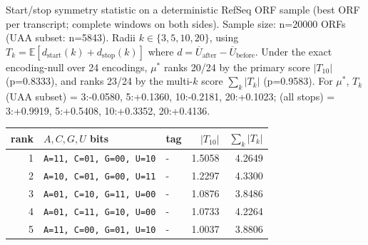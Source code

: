 Start/stop symmetry statistic on a deterministic RefSeq ORF sample (best ORF per transcript; complete windows on both sides). Sample size: n=20000 ORFs (UAA subset: n=5843). Radii $k\in\{3, 5, 10, 20\}$, using $T_k=\mathbb{E}[d_\mathrm{start}(k)+d_\mathrm{stop}(k)]$ where $d=\overline{U}_\mathrm{after}-\overline{U}_\mathrm{before}$. Under the exact encoding-null over 24 encodings, $\mu^\ast$ ranks 20/24 by the primary score $|T_{10}|$ (p=0.8333), and ranks 23/24 by the multi-$k$ score $\sum_k |T_k|$ (p=0.9583).
 For $\mu^\ast$, $T_k$ (UAA subset) = 3:-0.0580, 5:+0.1360, 10:-0.2181, 20:+0.1023; (all stops) = 3:+0.9919, 5:+0.5408, 10:+0.3352, 20:+0.4136.
\begin{center}
\small
\setlength{\tabcolsep}{6pt}
\renewcommand{\arraystretch}{1.15}
\begin{tabular}{rllrr}
\toprule
rank & $A,C,G,U$ bits & tag & $|T_{10}|$ & $\sum_k |T_k|$ \\
\midrule
1 & \texttt{A=11, C=01, G=00, U=10} & - & 1.5058 & 4.2649 \\
2 & \texttt{A=10, C=01, G=00, U=11} & - & 1.2297 & 4.3300 \\
3 & \texttt{A=01, C=10, G=11, U=00} & - & 1.0876 & 3.8486 \\
4 & \texttt{A=01, C=11, G=10, U=00} & - & 1.0733 & 4.2264 \\
5 & \texttt{A=11, C=00, G=01, U=10} & - & 1.0037 & 3.8806 \\
\bottomrule
\end{tabular}
\end{center}

